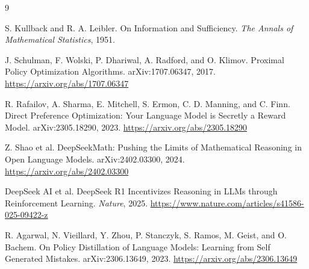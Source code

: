 \documentclass[11pt,a4paper]{ctexart}
\begin{document}
\begin{thebibliography}{9}

S. Kullback and R. A. Leibler.
\newblock On Information and Sufficiency.
\newblock \emph{The Annals of Mathematical Statistics}, 1951.

J. Schulman, F. Wolski, P. Dhariwal, A. Radford, and O. Klimov.
\newblock Proximal Policy Optimization Algorithms.
\newblock arXiv:1707.06347, 2017.
\newblock \url{https://arxiv.org/abs/1707.06347}

R. Rafailov, A. Sharma, E. Mitchell, S. Ermon, C. D. Manning, and C. Finn.
\newblock Direct Preference Optimization: Your Language Model is Secretly a Reward Model.
\newblock arXiv:2305.18290, 2023.
\newblock \url{https://arxiv.org/abs/2305.18290}

Z. Shao et al.
\newblock DeepSeekMath: Pushing the Limits of Mathematical Reasoning in Open Language Models.
\newblock arXiv:2402.03300, 2024.
\newblock \url{https://arxiv.org/abs/2402.03300}

DeepSeek AI et al.
\newblock DeepSeek R1 Incentivizes Reasoning in LLMs through Reinforcement Learning.
\newblock \emph{Nature}, 2025.
\newblock \url{https://www.nature.com/articles/s41586-025-09422-z}

R. Agarwal, N. Vieillard, Y. Zhou, P. Stanczyk, S. Ramos, M. Geist, and O. Bachem.
\newblock On Policy Distillation of Language Models: Learning from Self Generated Mistakes.
\newblock arXiv:2306.13649, 2023.
\newblock \url{https://arxiv.org/abs/2306.13649}

\end{thebibliography}
\end{document}
